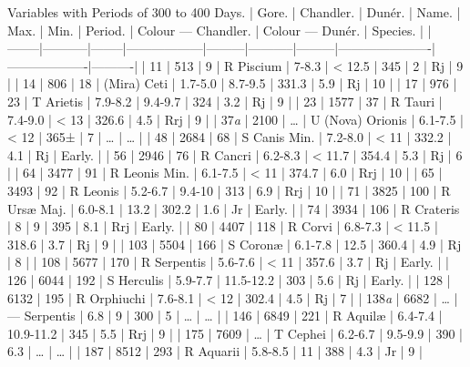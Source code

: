 \documentclass[a4paper, 12pt, oneside, polutonikogreek, english]{article}
\begin{document}
Variables with Periods of 300 to 400 Days. 
| Gore. | Chandler. | Dunér. | Name.      | Max.  | Min.   | Period. | Colour --- Chandler. | Colour --- Dunér. | Species. |
|--------|-----------|--------|------------------|---------|-----------|---------|----------------------|-------------------|----------|
| 11   | 513    | 9   | R Piscium    | 7-8.3  | < 12.5  | 345   | 2          | Rj        | 9    |
| 14   | 806    | 18   | (Mira) Ceti   | 1.7-5.0 | 8.7-9.5  | 331.3  | 5.9         | Rj        | 10    |
| 17   | 976    | 23   | T Arietis    | 7.9-8.2 | 9.4-9.7  | 324   | 3.2         | Rj        | 9    |
| 23   | 1577   | 37   | R Tauri     | 7.4-9.0 | < 13   | 326.6  | 4.5         | Rrj        | 9    |
| 37\emph{a} | 2100   | …   | U (Nova) Orionis | 6.1-7.5 | < 12   | 365±  | 7          | …         | …    |
| 48   | 2684   | 68   | S Canis Min.   | 7.2-8.0 | < 11   | 332.2  | 4.1         | Rj        | Early.  |
| 56   | 2946   | 76   | R Cancri     | 6.2-8.3 | < 11.7  | 354.4  | 5.3         | Rj        | 6    |
| 64   | 3477   | 91   | R Leonis Min.  | 6.1-7.5 | < 11   | 374.7  | 6.0         | Rrj        | 10    |
| 65   | 3493   | 92   | R Leonis     | 5.2-6.7 | 9.4-10  | 313   | 6.9         | Rrj        | 10    |
| 71   | 3825   | 100  | R Ursæ Maj.   | 6.0-8.1 | 13.2   | 302.2  | 1.6         | Jr        | Early.  |
| 74   | 3934   | 106  | R Crateris    | 8    | 9     | 395   | 8.1         | Rrj        | Early.  |
| 80   | 4407   | 118  | R Corvi     | 6.8-7.3 | < 11.5  | 318.6  | 3.7         | Rj        | 9    |
| 103  | 5504   | 166  | S Coronæ     | 6.1-7.8 | 12.5   | 360.4  | 4.9         | Rj        | 8    |
| 108  | 5677   | 170  | R Serpentis   | 5.6-7.6 | < 11   | 357.6  | 3.7         | Rj        | Early.  |
| 126  | 6044   | 192  | S Herculis    | 5.9-7.7 | 11.5-12.2 | 303   | 5.6         | Rj        | Early.  |
| 128  | 6132   | 195  | R Orphiuchi   | 7.6-8.1 | < 12   | 302.4  | 4.5         | Rj        | 7    |
| 138\emph{a} | 6682   | …   | --- Serpentis  | 6.8   | 9     | 300   | 5          | …         | …    |
| 146  | 6849   | 221  | R Aquilæ     | 6.4-7.4 | 10.9-11.2 | 345   | 5.5         | Rrj        | 9    |
| 175  | 7609   | …   | T Cephei     | 6.2-6.7 | 9.5-9.9  | 390   | 6.3         | …         | …    |
| 187  | 8512   | 293  | R Aquarii    | 5.8-8.5 | 11    | 388   | 4.3         | Jr        | 9    |
\end{document}
